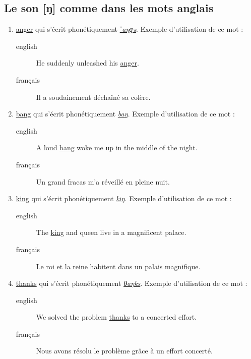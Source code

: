 \subsection{Le son [ŋ] comme dans les mots anglais}
\label{sec:org4b41268}
\begin{enumerate}
\item \href{http://www.wordreference.com/enfr/anger}{anger} qui s'écrit phonétiquement \href{https://en.oxforddictionaries.com/definition/anger}{\emph{ˈaŋɡə}}. Exemple d'utilisation de
ce mot : 
\begin{description}
\item[{english}] \textenglish{He suddenly unleashed his \href{https://youtu.be/lw64e7JVRj0}{anger}.}
\item[{français}] Il a soudainement déchaîné sa colère.
\end{description}
\item \href{http://www.wordreference.com/enfr/bang}{bang} qui s'écrit phonétiquement \href{https://en.oxforddictionaries.com/definition/bang}{\emph{baŋ}}. Exemple d'utilisation de ce
mot : 
\begin{description}
\item[{english}] \textenglish{A loud \href{https://youtu.be/N-AgYXz2n9Y}{bang} woke me up in the middle of the night.}
\item[{français}] Un grand fracas m'a réveillé en pleine nuit.
\end{description}
\item \href{http://www.wordreference.com/enfr/king}{king} qui s'écrit phonétiquement \href{https://en.oxforddictionaries.com/definition/king}{\emph{kɪŋ}}. Exemple d'utilisation de ce
mot : 
\begin{description}
\item[{english}] \textenglish{The \href{https://youtu.be/MRgFeZa\_I48}{king} and queen live in a magnificent palace.}
\item[{français}] Le roi et la reine habitent dans un palais magnifique.
\end{description}
\item \href{http://www.wordreference.com/enfr/thanks}{thanks} qui s'écrit phonétiquement \href{https://en.oxforddictionaries.com/definition/thanks}{\emph{θaŋks}}. Exemple d'utilisation de
ce mot :
\begin{description}
\item[{english}] \textenglish{We solved the problem \href{https://youtu.be/hQiipuDbbxw}{thanks} to a concerted effort.}
\item[{français}] Nous avons résolu le problème grâce à un effort
concerté.
\end{description}
\end{enumerate}
